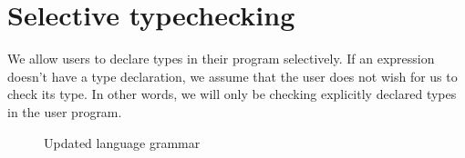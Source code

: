 \section{Selective typechecking}

We allow users to declare types in their program selectively. If an expression doesn't have a type declaration, we assume that the user does not wish for us to check its type. In other words, we will only be checking explicitly declared types in the user program.

\begin{figure}[hbt!]%
  \begin{grammar}
        \end{grammar}
    \caption{Updated language grammar}
    \label{fig_updatedGrammar}
\end{figure}

